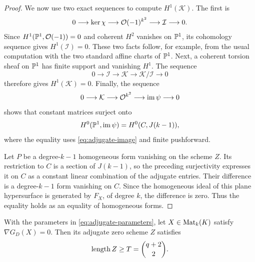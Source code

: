 \begin{proof}
We now use two exact sequences to compute \(H^1(\mathcal K)\).
The first is
\[
 0\longrightarrow\ker\chi\longrightarrow
 \mathcal O(-1)^{k^2}\longrightarrow\mathcal I\longrightarrow0.
\]
Since \(H^1(\mathbb P^1,\mathcal O(-1))=0\) and coherent \(H^2\) vanishes on
\(\mathbb P^1\), its cohomology sequence gives \(H^1(\mathcal I)=0\).
These two facts follow, for example, from the usual computation
with the two standard affine charts of \(\mathbb P^1\).
Next, a coherent torsion sheaf on \(\mathbb P^1\) has finite support and
vanishing \(H^1\).  The sequence
\[
 0\longrightarrow\mathcal I\longrightarrow\mathcal K
 \longrightarrow\mathcal K/\mathcal I\longrightarrow0
\]
therefore gives \(H^1(\mathcal K)=0\).
Finally, the sequence
\[
 0\longrightarrow\mathcal K\longrightarrow\mathcal O^{k^2}
 \longrightarrow\operatorname{im}\psi\longrightarrow0
\]
shows that constant matrices surject onto
\[
 H^0(\mathbb P^1,\operatorname{im}\psi)=H^0(C,J(k-1)),
\]
where the equality uses \eqref{eq:adjugate-image} and finite
pushforward.

Let \(P\) be a degree-\(k-1\) homogeneous form vanishing on the
scheme \(Z\).  Its restriction to \(C\) is a section of \(J(k-1)\),
so the preceding surjectivity expresses it on \(C\) as a constant
linear combination of the adjugate entries.
Their difference is a degree-\(k-1\) form vanishing on \(C\).
Since the homogeneous ideal of this plane hypersurface is generated
by \(F_X\), of degree \(k\), the difference is zero.
Thus the equality holds as an equality of homogeneous forms.
\end{proof}

\begin{proposition}
 \label{prop:adjugate-length}
With the parameters in \eqref{eq:adjugate-parameters}, let
\(X\in\operatorname{Mat}_k(K)\) satisfy \(\nabla G_D(X)=0\).
Then its adjugate zero scheme \(Z\) satisfies
\[
 \operatorname{length} Z\ge T=\binom{q+2}{2}.
\]
\end{proposition}

